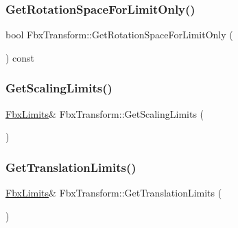 \subsubsection{\texorpdfstring{Get\+Rotation\+Space\+For\+Limit\+Only()}{GetRotationSpaceForLimitOnly()}}
{\footnotesize\ttfamily bool Fbx\+Transform\+::\+Get\+Rotation\+Space\+For\+Limit\+Only (\begin{DoxyParamCaption}{ }\end{DoxyParamCaption}) const}

\mbox{\label{class_fbx_transform_a435d21622e8a10efb1a38ef9d2bceb75}} 
\subsubsection{\texorpdfstring{Get\+Scaling\+Limits()}{GetScalingLimits()}}
{\footnotesize\ttfamily \hyperlink{class_fbx_limits}{Fbx\+Limits}\& Fbx\+Transform\+::\+Get\+Scaling\+Limits (\begin{DoxyParamCaption}{ }\end{DoxyParamCaption})}

\mbox{\label{class_fbx_transform_aa3ae31f067c3f4e42841867594754e95}} 
\subsubsection{\texorpdfstring{Get\+Translation\+Limits()}{GetTranslationLimits()}}
{\footnotesize\ttfamily \hyperlink{class_fbx_limits}{Fbx\+Limits}\& Fbx\+Transform\+::\+Get\+Translation\+Limits (\begin{DoxyParamCaption}{ }\end{DoxyParamCaption})}

\mbox{\label{class_fbx_transform_a14282735e64e69f9cf4f6e14fa36b841}} 
